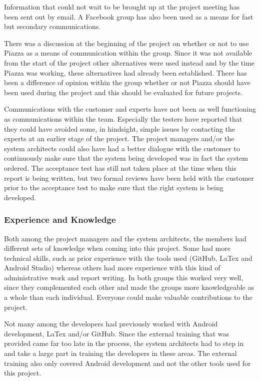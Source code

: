 \documentclass[a4paper]{article}
\begin{document}
Information that could not wait to be brought up at the project meeting has been sent out by email. A Facebook group has also been used as a means for fast but secondary communications.

There was a discussion at the beginning of the project on whether or not to use Piazza as a means of communication within the group. Since it was not available from the start of the project other alternatives were used instead and by the time Piazza was working, these alternatives had already been established. There has been a difference of opinion within the group whether or not Piazza should have been used during the project and this should be evaluated for future projects.

Communications with the customer and experts have not been as well functioning as communications within the team. Especially the testers have reported that they could have avoided some, in hindsight, simple issues by contacting the experts at an earlier stage of the project. The project managers and/or the system architects could also have had a better dialogue with the customer to continuously make sure that the system being developed was in fact the system ordered. The acceptance test has still not taken place at the time when this report is being written, but two formal reviews have been held with the customer prior to the acceptance test to make sure that the right system is being developed.



\subsubsection{Experience and Knowledge}
Both among the project managers and the system architects, the members had different sets of knowledge when coming into this project. Some had more technical skills, such as prior experience with the tools used (GitHub, LaTex and Android Studio) whereas others had more experience with this kind of administrative work and report writing. In both groups this worked very well, since they complemented each other and made the groups more knowledgeable as a whole than each individual. Everyone could make valuable contributions to the project.

Not many among the developers had previously worked with Android development, LaTex and/or GitHub. Since the external training that was provided came far too late in the process, the system architects had to step in and take a large part in training the developers in these areas. The external training also only covered Android development and not the other tools used for this project.
\end{document}
